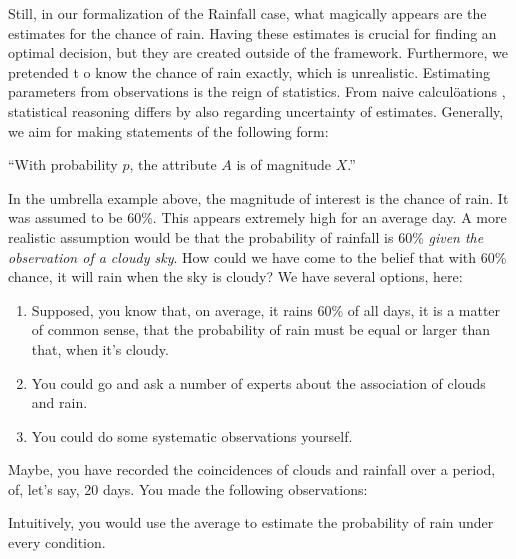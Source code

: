 \documentclass[]{svmono}
\newenvironment{Shaded}{\begin{snugshade}}{\end{snugshade}}
\newcommand{\KeywordTok}[1]{\textcolor[rgb]{0.13,0.29,0.53}{\textbf{#1}}}
\newcommand{\DataTypeTok}[1]{\textcolor[rgb]{0.13,0.29,0.53}{#1}}
\newcommand{\StringTok}[1]{\textcolor[rgb]{0.31,0.60,0.02}{#1}}
\newcommand{\OperatorTok}[1]{\textcolor[rgb]{0.81,0.36,0.00}{\textbf{#1}}}
\newcommand{\NormalTok}[1]{#1}
\begin{document}
Still, in our formalization of the Rainfall case, what magically appears
are the estimates for the chance of rain. Having these estimates is
crucial for finding an optimal decision, but they are created outside of
the framework. Furthermore, we pretended t o know the chance of rain
exactly, which is unrealistic. Estimating parameters from observations
is the reign of statistics. From naive calculöations , statistical
reasoning differs by also regarding uncertainty of estimates. Generally,
we aim for making statements of the following form:

``With probability \(p\), the attribute \(A\) is of magnitude \(X\).''

In the umbrella example above, the magnitude of interest is the chance
of rain. It was assumed to be 60\%. This appears extremely high for an
average day. A more realistic assumption would be that the probability
of rainfall is 60\% \emph{given the observation of a cloudy sky}. How
could we have come to the belief that with 60\% chance, it will rain
when the sky is cloudy? We have several options, here:

\begin{enumerate}
\def\labelenumi{\arabic{enumi}.}
\item
  Supposed, you know that, on average, it rains 60\% of all days, it is
  a matter of common sense, that the probability of rain must be equal
  or larger than that, when it's cloudy.
\item
  You could go and ask a number of experts about the association of
  clouds and rain.
\item
  You could do some systematic observations yourself.
\end{enumerate}

Maybe, you have recorded the coincidences of clouds and rainfall over a
period, of, let's say, 20 days. You made the following observations:

\begin{Shaded}
\end{Shaded}

Intuitively, you would use the average to estimate the probability of
rain under every condition.

\begin{Shaded}
\end{Shaded}
\end{document}
